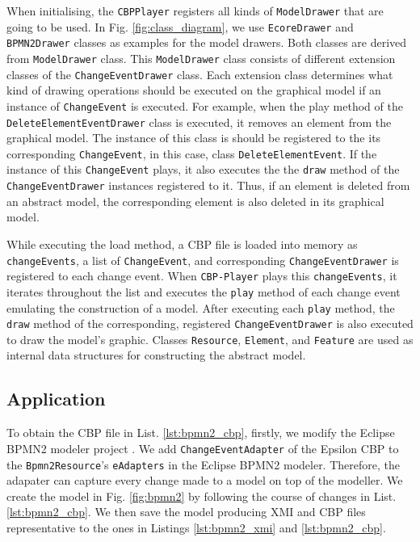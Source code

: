 \documentclass[conference]{IEEEtran}
\begin{document}
When initialising, the \texttt{CBPPlayer} registers all kinds of \texttt{ModelDrawer} that are going to be used. 
In Fig. \ref{fig:class_diagram}, we use \texttt{EcoreDrawer} and \texttt{BPMN2Drawer} classes as examples for the model drawers. 
Both classes are derived from \texttt{ModelDrawer} class. This \texttt{ModelDrawer} class consists of 
different extension classes of the \texttt{ChangeEventDrawer} class. Each extension class determines
what kind of drawing operations should be executed on the graphical model if an instance of \texttt{ChangeEvent} is executed.
For example, when the play method of the \texttt{DeleteElementEventDrawer} class is executed,
it removes an element from the graphical model. The instance of this class is should be registered to
the its corresponding \texttt{ChangeEvent}, in this case, class \texttt{DeleteElementEvent}. 
If the instance of this \texttt{ChangeEvent} plays, it also executes the the \texttt{draw} method of 
the \texttt{ChangeEventDrawer} instances registered to it. Thus, if an element is deleted from an abstract model,
the corresponding element is also deleted in its graphical model. 

While executing the load method, a CBP file is loaded into memory as \texttt{changeEvents}, 
a list of \texttt{ChangeEvent}, and corresponding \texttt{ChangeEventDrawer} is registered to each change event. 
When \texttt{CBP-Player} plays this \texttt{changeEvents}, it iterates throughout the list and executes  
the \texttt{play} method of each change event emulating the construction of a model. 
After executing each \texttt{play} method, the \texttt{draw} method of 
the corresponding, registered \texttt{ChangeEventDrawer} is also executed to draw the model's graphic.
Classes \texttt{Resource}, \texttt{Element}, and \texttt{Feature} are used as internal data structures 
for constructing the abstract model.

\subsection{Application}
\label{sec:application}
To obtain the CBP file in List. \ref{lst:bpmn2_cbp}, firstly, we modify
the Eclipse BPMN2 modeler project \cite{eclipse2019bpmn2}. We add \texttt{ChangeEventAdapter} \cite{epsilonlabs2019changeeventadapter}
of the Epsilon CBP \cite{DBLP:conf/models/YohannisKP17}  to the \texttt{Bpmn2Resource}'s \texttt{eAdapters}
in the Eclipse BPMN2 modeler. Therefore, the adapater can capture every change made to a model on top of the modeller.
We create the model in Fig. \ref{fig:bpmn2} by following the course of changes in List. \ref{lst:bpmn2_cbp}.
We then save the model producing XMI and CBP files representative to the ones 
in Listings \ref{lst:bpmn2_xmi} and \ref{lst:bpmn2_cbp}. 
 
\end{document}
